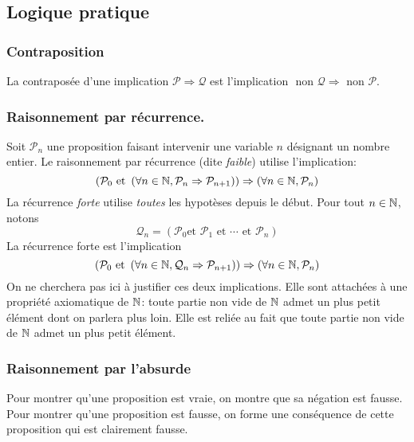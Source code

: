 \subsection{Logique pratique}
\subsubsection{Contraposition}
La contraposée d'une implication $\mathcal{P} \Rightarrow \mathcal{Q}$ est l'implication $\text{ non } \mathcal{Q} \Rightarrow \text{ non } \mathcal{P}$.
\subsubsection{Raisonnement par récurrence.}
Soit $\mathcal{P}_n$ une proposition faisant intervenir une variable $n$ désignant un nombre entier. Le raisonnement par récurrence (dite \emph{faible}) utilise l'implication:
\begin{displaymath}
 \left( \mathcal{P}_0 \text{ et } \left( \forall n \in \mathbb{N}, \mathcal{P}_n \Rightarrow \mathcal{P}_{n+1}\right) \right) 
 \Rightarrow \left( \forall n \in \mathbb{N}, \mathcal{P}_n\right) 
\end{displaymath}
La récurrence \emph{forte} utilise \emph{toutes} les hypotèses depuis le début. Pour tout $n\in \mathbb{N}$, notons
\begin{displaymath}
 \mathcal{Q}_n = \left( \mathcal{P}_0\text{et } \mathcal{P}_1 \text{ et } \cdots \text{ et } \mathcal{P}_n\right) 
\end{displaymath}
La récurrence forte est l'implication
\begin{displaymath}
 \left( \mathcal{P}_0 \text{ et } \left( \forall n \in \mathbb{N}, \mathcal{Q}_n \Rightarrow \mathcal{P}_{n+1}\right) \right) 
 \Rightarrow \left( \forall n \in \mathbb{N}, \mathcal{P}_n\right) 
\end{displaymath}
On ne cherchera pas ici à justifier ces deux implications. Elle sont attachées à une propriété axiomatique de $\mathbb{N}$: toute partie non vide de $\mathbb{N}$ admet un plus petit élément dont on parlera plus loin.
Elle est reliée au fait que toute partie non vide de $\mathbb{N}$ admet un plus petit élément.
\subsubsection{Raisonnement par l'absurde}
 Pour montrer qu'une proposition est vraie, on montre que sa négation est fausse. Pour montrer qu'une proposition est fausse, on forme une conséquence de cette proposition qui est clairement fausse.
